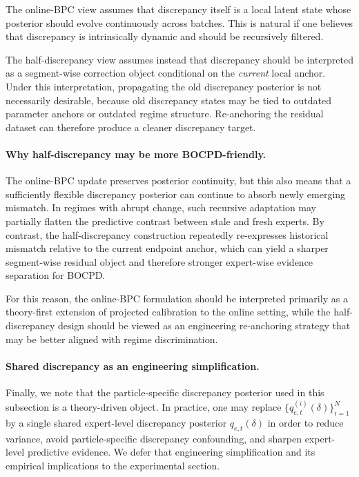 \documentclass{article}
\begin{document}
The online-BPC view assumes that discrepancy itself is a local latent state whose posterior should evolve continuously across batches. This is natural if one believes that discrepancy is intrinsically dynamic and should be recursively filtered.

The half-discrepancy view assumes instead that discrepancy should be interpreted as a segment-wise correction object conditional on the \emph{current} local anchor. Under this interpretation, propagating the old discrepancy posterior is not necessarily desirable, because old discrepancy states may be tied to outdated parameter anchors or outdated regime structure. Re-anchoring the residual dataset can therefore produce a cleaner discrepancy target.

\paragraph{Why half-discrepancy may be more BOCPD-friendly.}
The online-BPC update preserves posterior continuity, but this also means that a sufficiently flexible discrepancy posterior can continue to absorb newly emerging mismatch. In regimes with abrupt change, such recursive adaptation may partially flatten the predictive contrast between stale and fresh experts. By contrast, the half-discrepancy construction repeatedly re-expresses historical mismatch relative to the current endpoint anchor, which can yield a sharper segment-wise residual object and therefore stronger expert-wise evidence separation for BOCPD.

For this reason, the online-BPC formulation should be interpreted primarily as a theory-first extension of projected calibration to the online setting, while the half-discrepancy design should be viewed as an engineering re-anchoring strategy that may be better aligned with regime discrimination.

\paragraph{Shared discrepancy as an engineering simplification.}
Finally, we note that the particle-specific discrepancy posterior used in this subsection is a theory-driven object. In practice, one may replace $\{q_{e,t}^{(i)}(\delta)\}_{i=1}^N$ by a single shared expert-level discrepancy posterior $q_{e,t}(\delta)$ in order to reduce variance, avoid particle-specific discrepancy confounding, and sharpen expert-level predictive evidence. We defer that engineering simplification and its empirical implications to the experimental section.
\end{document}
